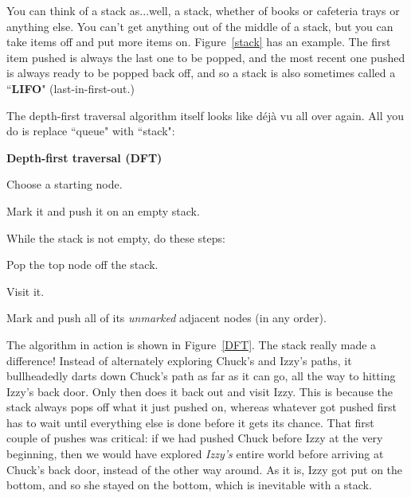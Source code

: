 You can think of a stack as...well, a stack, whether of books or cafeteria
trays or anything else. You can't get anything out of the middle of a
stack, but you can take items off and put more items on. Figure~\ref{stack}
has an example. The first item pushed is always the last one to be popped,
and the most recent one pushed is always ready to be popped back off, and
so a stack is also sometimes called a ``\textbf{LIFO}" (last-in-first-out.)


The depth-first traversal algorithm itself looks like d\'ej\`a vu all over
again. All you do is replace ``queue" with ``stack":

\vspace{.1in}
\begin{samepage}
\begin{framed}
\textbf{Depth-first traversal (DFT)}
\begin{compactenum}
\item Choose a starting node.
\item Mark it and push it on an empty stack.
\item While the stack is not empty, do these steps:
    \begin{compactenum}
    \item Pop the top node off the stack.
    \item Visit it.
    \item Mark and push all of its \textit{unmarked} adjacent nodes (in
any order).
    \end{compactenum}
\end{compactenum}
\end{framed}
\end{samepage}
\vspace{.2in}

The algorithm in action is shown in Figure~\ref{DFT}. The stack really made
a difference! Instead of alternately exploring Chuck's and Izzy's paths, it
bullheadedly darts down Chuck's path as far as it can go, all the way to
hitting Izzy's back door. Only then does it back out and visit Izzy. This
is because the stack always pops off what it just pushed on, whereas
whatever got pushed first has to wait until everything else is done before
it gets its chance. That first couple of pushes was critical: if we had
pushed Chuck before Izzy at the very beginning, then we would have explored
\textit{Izzy's} entire world before arriving at Chuck's back door, instead
of the other way around. As it is, Izzy got put on the bottom, and so she
stayed on the bottom, which is inevitable with a stack.


